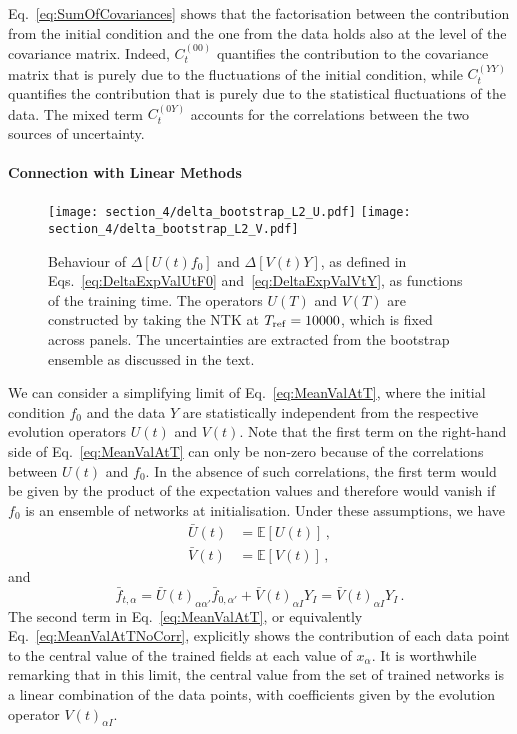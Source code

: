Eq.~\eqref{eq:SumOfCovariances} shows that the factorisation between the
contribution from the initial condition and the one from the data holds also at
the level of the covariance matrix. Indeed, $C_t^{(00)}$ quantifies the
contribution to the covariance matrix that is purely due to the fluctuations of
the initial condition, while $C_t^{(YY)}$ quantifies the contribution that is
purely due to the statistical fluctuations of the data. The mixed term
$C_t^{(0Y)}$ accounts for the correlations between the two sources of
uncertainty.


\paragraph{Connection with Linear Methods}
\begin{figure}[t!]
  \centering
  \texttt{[image: section\_4/delta\_bootstrap\_L2\_U.pdf]}
  \texttt{[image: section\_4/delta\_bootstrap\_L2\_V.pdf]}
  \caption{Behaviour of $\Delta [U(t)f_0]$ and $\Delta [V(t)Y]$, as defined in
  Eqs.~\eqref{eq:DeltaExpValUtF0} and~\eqref{eq:DeltaExpValVtY}, as functions
  of the training
  time. The operators $U(T)$ and $V(T)$ are constructed by taking the 
  NTK at $T_{\rm ref} = 10000$, which is fixed across panels. The uncertainties are extracted
  from the bootstrap ensemble as discussed in the text.}
    \label{fig:xT3_exp_val}
\end{figure}

We can consider a simplifying limit of Eq.~\eqref{eq:MeanValAtT}, where the
initial condition $f_0$ and the data $Y$ are statistically independent
from the respective
evolution operators $U(t)$ and $V(t)$. Note that the first term on the right-hand
side of Eq.~\eqref{eq:MeanValAtT} can only be non-zero because of the
correlations between $U(t)$ and $f_0$. In the absence of such correlations, the
first term would be given by the product of the expectation values and therefore
would vanish if $f_0$ is an ensemble of networks at initialisation. Under these
assumptions, we have
\begin{align}
    \label{eq:MeanUt}
    \bar{U}(t)
        &= \mathbb{E}\left[U(t)\right]\, , \\
    \label{eq:MeanVt}
    \bar{V}(t)
        &= \mathbb{E}\left[V(t)\right]\, ,
\end{align}
and
\begin{equation}
    \label{eq:MeanValAtTNoCorr}
    \bar{f}_{t,\alpha} = \bar{U}(t)_{\alpha\alpha'} \bar{f}_{0,\alpha'}
        + \bar{V}(t)_{\alpha I} Y_I = \bar{V}(t)_{\alpha I} Y_I \, .
\end{equation}
The second term in Eq.~\eqref{eq:MeanValAtT}, or equivalently
Eq.~\eqref{eq:MeanValAtTNoCorr}, explicitly shows the contribution of each data
point to the central value of the trained fields at each value of $x_{\alpha}$.
It is worthwhile remarking that in this limit, the central value from the set of
trained networks is a linear combination of the data points, with coefficients
given by the evolution operator $V(t)_{\alpha I}$.

